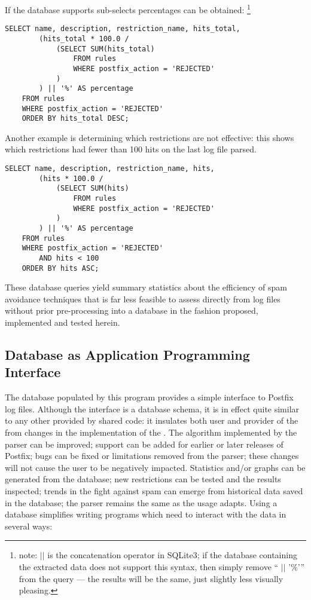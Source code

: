 If the database supports sub-selects percentages can be obtained:
\footnote{\SQL{} note: $||$ is the concatenation operator in SQLite3; if
the database containing the extracted data does not support this syntax,
then simply remove `` $||$ '$\%$'\hspace{1ex}'' from the query --- the
results will be the same, just slightly less visually pleasing.}

\begin{verbatim}
SELECT name, description, restriction_name, hits_total,
        (hits_total * 100.0 /
            (SELECT SUM(hits_total)
                FROM rules
                WHERE postfix_action = 'REJECTED'
            )
        ) || '%' AS percentage
    FROM rules
    WHERE postfix_action = 'REJECTED'
    ORDER BY hits_total DESC;
\end{verbatim}

Another example is determining which restrictions are not effective: this
shows which restrictions had fewer than 100 hits on the last log file
parsed.

\begin{verbatim}
SELECT name, description, restriction_name, hits,
        (hits * 100.0 /
            (SELECT SUM(hits)
                FROM rules
                WHERE postfix_action = 'REJECTED'
            )
        ) || '%' AS percentage
    FROM rules
    WHERE postfix_action = 'REJECTED'
        AND hits < 100
    ORDER BY hits ASC;
\end{verbatim}

These database queries yield summary statistics about the efficiency of
spam avoidance techniques that is far less feasible to assess directly from
log files without prior pre-processing into a database in the fashion
proposed, implemented and tested herein.

\subsection{Database as Application Programming Interface}

\label{database as API}

The database populated by this program provides a simple interface to
Postfix log files.  Although the interface is a database schema, it is in
effect quite similar to any other \API{} provided by shared code: it
insulates both user and provider of the \API{} from changes in the
implementation of the \API{}\@.  The algorithm implemented by the parser
can be improved; support can be added for earlier or later releases of
Postfix; bugs can be fixed or limitations removed from the parser; these
changes will not cause the user to be negatively impacted.  Statistics
and/or graphs can be generated from the database; new restrictions can be
tested and the results inspected; trends in the fight against spam can
emerge from historical data saved in the database; the parser remains the
same as the usage adapts.  Using a database simplifies writing programs
which need to interact with the data in several ways:

